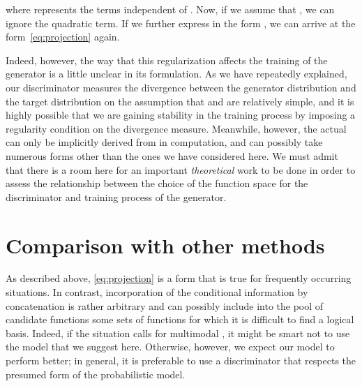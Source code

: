 \documentclass{article}
\begin{document}
where  represents the terms independent of .
Now, if we assume that , we can ignore the quadratic term.
If we further express  in the form , we can arrive at the form~\eqref{eq:projection} again. 

Indeed, however, the way that this regularization affects the training of the generator  is a little unclear in its formulation.
As we have repeatedly explained, our discriminator measures the divergence between the generator distribution  and the target distribution  on the assumption that  and  are relatively simple, and it is highly possible that we are gaining stability in the training process by imposing a regularity condition on the divergence measure.
Meanwhile, however, the actual  can only be implicitly derived from  in computation, and can possibly take numerous forms other than the ones we have considered here.
We must admit that there is a room here for an important \textit{theoretical} work to be done in order to assess the relationship between the choice of the function space for the discriminator and training process of the generator. 

\section{\label{sec:related_works}Comparison with other methods}

As described above, \eqref{eq:projection} is a form that is true for frequently occurring situations.
In contrast, incorporation of the conditional information by concatenation is rather arbitrary and can possibly include into the pool of candidate functions some sets of functions for which it is difficult to find a logical basis.  
Indeed, if the situation calls for multimodal , it might be smart not to use the model that we suggest here.
Otherwise, however, we expect our model to perform better;  in general, it is preferable to use a discriminator that respects the presumed form of the probabilistic model.
\end{document}
